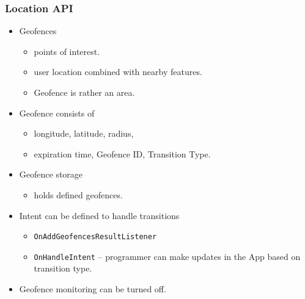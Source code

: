 \documentclass[10pt,xcolor=pdflatex]{beamer}
\begin{document}
\begin{frame}[fragile]\frametitle{Location API}
\begin{itemize}
	\item Geofences
	  \begin{itemize}
        \item points of interest.
		\item user location combined with nearby features.
		\item Geofence is rather an area.
	  \end{itemize}
    \item Geofence consists of
	  \begin{itemize}
		\item longitude, latitude, radius,
		\item expiration time, Geofence ID, Transition Type.
	  \end{itemize}
    \item Geofence storage
      \begin{itemize}
    	\item holds defined geofences.
      \end{itemize}
    \item Intent can be defined to handle transitions
      \begin{itemize}
    	\item \texttt{OnAddGeofencesResultListener}
		\item \texttt{OnHandleIntent} -- programmer can make updates in the App based on transition type.
      \end{itemize}
    \item Geofence monitoring can be turned off.
\end{itemize}
\end{frame}
\end{document}
